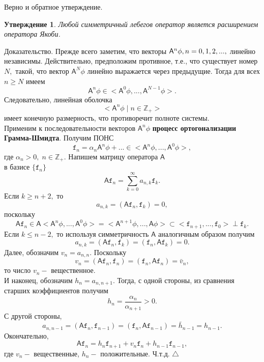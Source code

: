 \documentclass[12 pt, a4 paper]{article}
\theoremstyle{plain}   \newtheorem{Pro}{Задача}
\newtheorem{Sta}{Утверждение}
\begin{document}
Верно и обратное утверждение.
\begin{Sta}
Любой симметричный лебегов оператор является расширением
оператора Якоби.
\end{Sta}						
{\Large Доказательство.}
Прежде всего заметим, что векторы
$ \mathsf{A}^n \phi , \\
n=0,1,2,..., $
линейно независимы. Действительно, предположим противное, т.е.,
что существует номер
$ N , $
такой, что вектор
$ \mathsf{A}^N \phi $
линейно выражается через предыдущие. Тогда для всех
$ n \geq N $
имеем
$$
  \mathsf{A}^n \phi \in <\mathsf{A}^0 \phi ,..., \mathsf{A}^{N-1}
  \phi >.
$$
Следовательно, линейная оболочка
$$
  <\mathsf{A}^n \phi \; | \; n \in \mathbb{Z}_+ >
$$
имеет конечную размерность, что противоречит полноте системы.\\
Применим к последовательности векторов
$ \mathsf{A}^n \phi $
{\bfseries процесс ортогонализации Грамма-Шмидта}.
Получим ПОНС
$$
  \mathtt{f}_n =\alpha _n \mathsf{A}^n \phi +...
  \in <\mathsf{A}^n \phi ,..., \mathsf{A}^0 \phi >,
$$
где
$ \alpha _n >0, \; n \in \mathbb{Z}_+ .  $
Напишем матрицу оператора
$ \mathsf{A} $\\
в базисе
$ \{ \mathtt{f}_n \} $
$$
  \mathsf{A}\mathtt{f}_n = \sum _{k=0}^{\infty}
  a_{n,k}\mathtt{f}_k .
$$
Если
$ k \geq n+2, $
то
$$
  a_{n,k}=(\mathsf{A}\mathtt{f}_n ,\mathtt{f}_k )=0,
$$
поскольку
$$
  \mathsf{A}\mathtt{f}_n \in \mathsf{A}
  <\mathsf{A}^n \phi ,..., \mathsf{A}^0 \phi >
  = <\mathsf{A}^{n+1} \phi ,..., \mathsf{A} \phi >
  \subset <\mathtt{f}_{n+1},...,\mathtt{f}_0 > \perp
  \mathtt{f}_k .
$$
Если
$ k \leq n-2 , $
то используя симметричность
$ \mathsf{A} $
аналогичным образом получим
$$
  a_{n,k}=(\mathsf{A}\mathtt{f}_n , \mathtt{f}_k )=
  (\mathtt{f}_n , \mathsf{A}\mathtt{f}_k )=0.
$$
Далее, обозначим
$ v_n =a_{n,n} . $
Поскольку
$$
  v_n =(\mathsf{A}\mathtt{f}_n , \mathtt{f}_n )=
  (\mathtt{f}_n , \mathsf{A}\mathtt{f}_n ) =
  \bar v_n ,
$$
то число
$ v_n - $
вещественное.
\\
И наконец, обозначим
$ h_n =a_{n,n+1} . $
Тогда, с одной стороны, из сравнения старших коэффициентов
получим
$$
  h_n =\frac{\alpha _n}{\alpha _{n+1}}>0.
$$
С другой стороны,
$$
  a_{n,n-1}=(\mathsf{A}\mathtt{f}_n , \mathtt{f}_{n-1})=
  (\mathtt{f}_n , \mathsf{A}\mathtt{f}_{n-1})=
  \bar h_{n-1}=h_{n-1}.
$$
Окончательно,
$$
  \mathsf{A}\mathtt{f}_n =
  h_n \mathtt{f}_{n+1}+v_n \mathtt{f}_n +h_{n-1}\mathtt{f}_{n-1} ,
$$
где
$ v_n - $
вещественные,
$ h_n - $
положительные. Ч.т.д.
$ \triangle $
\newpage
\end{document}
